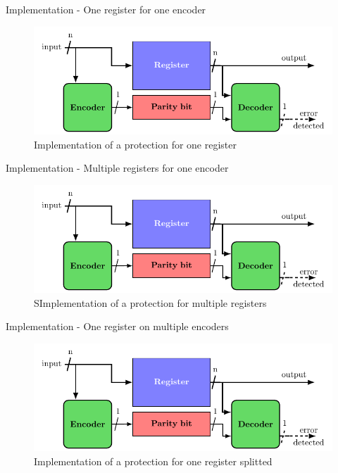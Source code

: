 \begin{frame}{Implementation - One register for one encoder}
    \begin{figure}
        \centering
        \includegraphics[width=.75\textwidth, page=1]{src/4_strategies/img/archi_contremesures.pdf}
        \caption{Implementation of a protection for one register}
        \label{fig:simple_parity_implem}
    \end{figure}
\end{frame}

\begin{frame}{Implementation - Multiple registers for one encoder}
    \begin{figure}
        \centering
        \includegraphics[width=.8\textwidth, page=4]{src/4_strategies/img/archi_contremesures.pdf}
        \caption{SImplementation of a protection for multiple registers}
        \label{fig:secded_implem_independant_register}
    \end{figure}
\end{frame}

\begin{frame}{Implementation - One register on multiple encoders}
    \begin{figure}
        \centering
        \includegraphics[width=.9\textwidth, page=6]{src/4_strategies/img/archi_contremesures.pdf}
        \caption{Implementation of a protection for one register splitted}
        \label{fig:secded_implem_splitted}
    \end{figure}
\end{frame}

